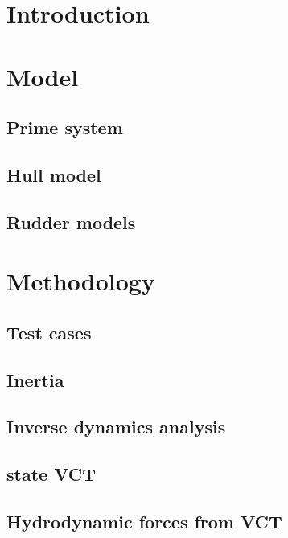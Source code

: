 \documentclass[preprint,9pt,authoryear]{elsarticle}
\begin{document}
\section{Introduction}
\label{sec:introduction}


\section{Model}

\subsection{Prime system}
\label{sec:prime_system}


\FloatBarrier
\subsection{Hull model}

\subsection{Rudder models}



\section{Methodology}
\subsection{Test cases}

\FloatBarrier

\subsection{Inertia}

%
\subsection{Inverse dynamics analysis}
\subsection{state VCT}
\subsection{Hydrodynamic forces from VCT}

\FloatBarrier
\end{document}
